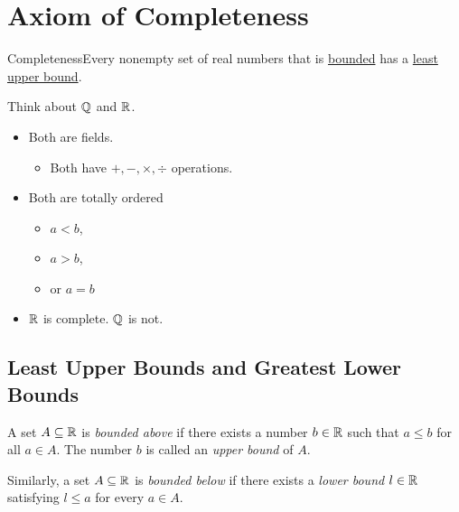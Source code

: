 



\setcounter{section}{2}
\renewcommand{\theenumi}{\arabic{enumi}}
\renewcommand{\labelenumi}{\theenumi.}
\section{Axiom of Completeness}

\begin{axiom}
    {Completeness}Every nonempty set of real numbers that is \hyperref[def:1.3.1]{bounded} has a \hyperref[def:1.3.2]{least upper bound}.
\end{axiom}

Think about \(\mathbb{Q}\) and \(\mathbb{R}\).
\begin{itemize}
    \item Both are fields.
          \begin{itemize}
              \item Both have \(+,-,\times,\div\) operations.
          \end{itemize}
    \item Both are totally ordered
          \begin{itemize}
              \item \(a < b\),
              \item \(a > b\),
              \item or \(a = b\)
          \end{itemize}
    \item \(\mathbb{R}\) is complete. \(\mathbb{Q}\) is not.
\end{itemize}

\subsection{Least Upper Bounds and Greatest Lower Bounds}

\begin{definition}
    A set \(A \subseteq \mathbb{R}\) is \textit{bounded above} if there exists a number \(b \in \mathbb{R}\) such that \(a \leq b\) for all \(a \in A\). The number \(b\) is called an \textit{upper bound} of \(A\).

    Similarly, a set \(A \subseteq \mathbb{R}\) is \textit{bounded below} if there exists a \textit{lower bound} \(l \in \mathbb{R}\) satisfying \(l \leq a\) for every \(a \in A\).
\end{definition}

